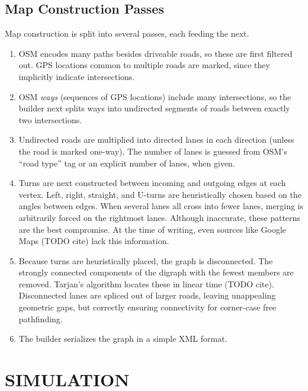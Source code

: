 \documentclass[letterpaper, 10 pt, conference]{ieeeconf}  %
\begin{document}
\subsection{Map Construction Passes}


Map construction is split into several passes, each feeding the next.
\begin{enumerate}
  \item OSM encodes many paths besides driveable roads, so these are first
        filtered out. GPS locations common to multiple roads are marked, since
        they implicitly indicate intersections.
  \item OSM \emph{ways} (sequences of GPS locations) include many
        intersections, so the builder next splits ways into undirected
        segments of roads between exactly two intersections.
  \item Undirected roads are multiplied into directed lanes in each direction
        (unless the road is marked one-way). The number of lanes is guessed from
        OSM's ``road type'' tag or an explicit number of lanes, when given.
  \item Turns are next constructed between incoming and outgoing edges at each
        vertex. Left, right, straight, and U-turns are heuristically chosen
        based on the angles between edges. When several lanes all cross into
        fewer lanes, merging is arbitrarily forced on the rightmost lanes.
        Although inaccurate, these patterns are the best compromise. At the
        time of writing, even sources like Google Maps (TODO cite) lack this
        information.
  \item Because turns are heuristically placed, the graph is disconnected. The
        strongly connected components of the digraph with the fewest members are
        removed. Tarjan's algorithm locates these in linear time (TODO cite).
        Disconnected lanes are spliced out of larger roads, leaving unappealing
        geometric gaps, but correctly ensuring connectivity for corner-case free
        pathfinding.
  \item The builder serializes the graph in a simple XML format.
\end{enumerate}


\section{SIMULATION}
\end{document}
